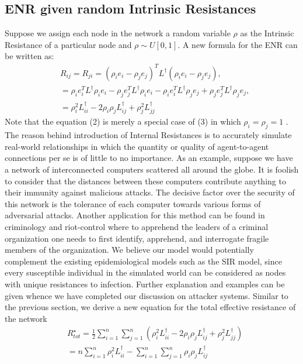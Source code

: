 \documentclass{article}
\begin{document}
	\subsection{ENR given random Intrinsic Resistances}
	Suppose we assign each node in the network a random variable $\rho$ as the Intrinsic Resistance of a particular node and $\rho \sim U[0,1]$. A new formula for the ENR can be written as:
	\begin{equation}
	\begin{aligned}
		&R_{ij} = R_{ji} = (\rho_i e_i - \rho_j e_j)^T L^{\dag} (\rho_i e_i - \rho_j e_j), \\
		&=\rho_i e_i^{T}L^{\dag}\rho_i e_i -\rho_j e_j^{T}L^{\dag}\rho_i e_i - \rho_i e_i^{T}L^{\dag}\rho_j e_j + \rho_j e_j^{T}L^{\dag}\rho_j e_j , \\
		&= \rho_i^{2} L_{ii}^{\dag} - 2\rho_i \rho_j L_{ij}^{\dag} + \rho_j^{2} L_{jj}^{\dag}
	\end{aligned}
	\end{equation}
	Note that the equation (2) is merely a special case of (3) in which $\rho_i = \rho_j = 1$ . The reason behind introduction of Internal Resistances is to accurately simulate real-world relationships in which the quantity or quality of agent-to-agent connections per se is of little to no importance. As an example, suppose we have a network of interconnected computers scattered all around the globe. It is foolish to consider that the distances between these computers contribute anything to their immunity against malicious attacks. The decisive factor over the security of this network is the tolerance of each computer towards various forms of adversarial attacks. Another application for this method can be found in criminology and riot-control where to apprehend the leaders of a criminal organization one needs to first identify, apprehend, and interrogate fragile members of the organization. We believe our model would potentially complement the existing epidemiological models such as the SIR model, since every susceptible individual in the simulated world can be considered as nodes with unique resistances to infection. Further explanation and examples can be given whence we have completed our discussion on attacker systems. Similar to the previous section, we derive a new equation for the total effective resistance of the network
	\begin{equation}
		\begin{aligned}
			&R_{tot}^{\star}=\frac{1}{2}\sum_{i=1}^{n}\sum_{j=1}^{n} \left(\rho_i^{2} L_{ii}^{\dag} - 2\rho_i \rho_j L_{ij}^{\dag} + \rho_j^{2} L_{jj}^{\dag} \right) \\
			&= n\sum_{i=1}^{n} \rho_i^{2}L_{ii}^{\dag} - \sum_{i=1}^{n}\sum_{j=1}^{n} \rho_i\rho_j L_{ij}^{\dag}
		\end{aligned}
	\end{equation} 
\end{document}
